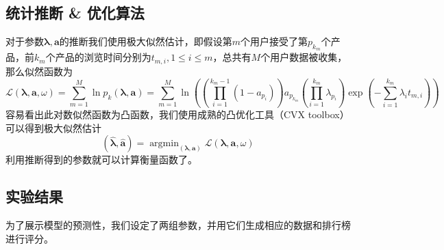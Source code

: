 \documentclass[UTF8]{ctexart}
\theoremstyle{plain}
\theoremstyle{definition}
\theoremstyle{remark}
\DeclareMathOperator*{\argmin}{argmin}
\begin{document}
	\subsection{统计推断 \& 优化算法}
	对于参数$\bm{\lambda}, \bm{a}$的推断我们使用极大似然估计，即假设第$m$个用户接受了第$p_{k_m}$个产品，前$k_m$个产品的浏览时间分别为$t_{m,i}, 1 \leq i \leq m$，总共有$M$个用户数据被收集，那么似然函数为
	\begin{equation}
	\mathcal{L}\left(\bm{\lambda}, \bm{a}, \omega\right) = \sum_{m=1}^M \ln p_k(\bm{\lambda}, \bm{a}) = \sum_{m=1}^M \ln \left(\left(\prod_{i=1}^{k_m-1}(1-a_{p_i})\right)a_{p_{k_m}}\left(\prod_{i=1}^{k_m} \lambda_{p_i}\right)\exp\left(-\sum_{i=1}^{k_m}\lambda_i t_{m,i}\right)\right)
	\end{equation}
	容易看出此对数似然函数为凸函数，我们使用成熟的凸优化工具（CVX toolbox）可以得到极大似然估计
	$$
	\left(\bm{\hat{\lambda}}, \bm{\hat{a}}\right) = \argmin_{\left(\bm{\lambda}, \bm{a}\right)} \mathcal{L}\left(\bm{\lambda}, \bm{a}, \omega\right)
	$$
	利用推断得到的参数就可以计算衡量函数了。
	\subsection{实验结果}
	为了展示模型的预测性，我们设定了两组参数，并用它们生成相应的数据和排行榜进行评分。
	
\end{document}
